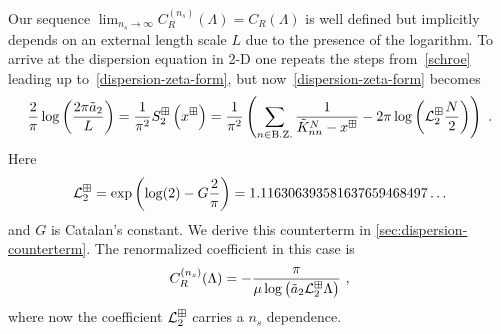 Our sequence $\lim_{n_s\to\infty}C^{(n_s)}_R(\Lambda) = C_R(\Lambda)$ is well defined but implicitly depends on an external length scale $L$ due to the presence of the logarithm.  To arrive at the dispersion equation in 2-D one repeats the steps from~\eqref{schroe} leading up to~\eqref{dispersion-zeta-form}, but now~\eqref{dispersion-zeta-form} becomes
\begin{equation}
    \frac{2}{\pi} \log \left(\frac{2\pi \tilde a_{2}}{L}\right)=\frac{1}{\pi^2}S^{\boxplus}_2\left(x^\boxplus\right)
    =
    \frac{1}{\pi^2}
    \left(
        \sum_{n\in\operatorname{B.Z.}}\frac{1}{\tilde{K}^N_{nn}-x^\boxplus}
        -2\pi \log \left(\mathcal{L}^\boxplus_2\frac{N}{2}\right)
    \right)\ .
\end{equation}
Here
\begin{equation}
    \mathcal{L}^\boxplus_{2}
    =
    \exp \left(\log (2)-G \frac{2}{\pi}\right)
    =
    1.116306393581637659468497 \ldots
\end{equation}
and $G$ is Catalan's constant.  We derive this counterterm in \ref{sec:dispersion-counterterm}.  The renormalized coefficient in this case is
\begin{equation}\label{eq:C2-dispersion}
C^{(n_s)}_R(\Lambda)=-\frac{ \pi}{\mu \log \left(\tilde a_{2} \mathcal{L}^\boxplus_2\Lambda\right)}\ ,
\end{equation}
where now the coefficient $\mathcal{L}_2^\boxplus$ carries a $n_s$ dependence.

